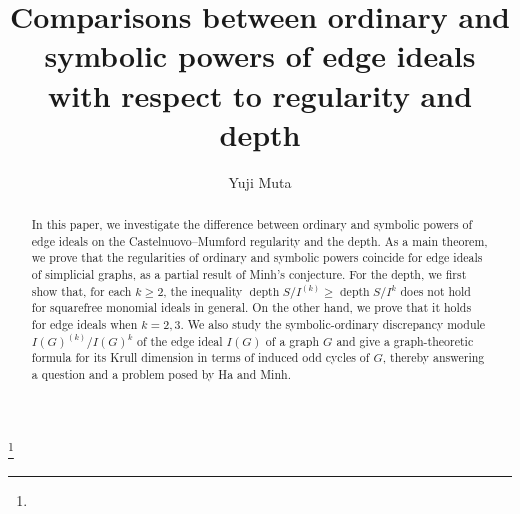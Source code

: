 \documentclass[12pt]{amsart}
\theoremstyle{definition}
\theoremstyle{remark}
\DeclareMathOperator{\depth}{depth}
\begin{document}

\title[Comparisons between ordinary and symbolic powers of edge ideals]{Comparisons between ordinary and symbolic powers of edge ideals with respect to regularity and depth}

\author{Yuji Muta}

\address[Y. Muta]{Department of Mathematics, Okayama University, 3-1-1 Tsushima-naka, Kita-ku, Okayama 700-8530 Japan.}



\begin{abstract}
In this paper, we investigate the difference between ordinary and symbolic powers of edge ideals on the Castelnuovo--Mumford regularity and the depth. As a main theorem, we prove that the regularities of ordinary and symbolic powers coincide for edge ideals of simplicial graphs, as a partial result of Minh's conjecture. For the depth, we first show that, for each $k\geq2$, the inequality $\depth S/I^{(k)}\geq\depth S/I^{k}$ does not hold for squarefree monomial ideals in general. On the other hand, we prove that it holds for edge ideals when $k=2,3$. We also study the symbolic-ordinary discrepancy module $I(G)^{(k)}/I(G)^{k}$ of the edge ideal $I(G)$ of a graph $G$ and give a graph-theoretic formula for its Krull dimension in terms of induced odd cycles of $G$, thereby answering a question and a problem posed by Ha and Minh. 
\end{abstract}






\thanks{}
	
\end{document}
